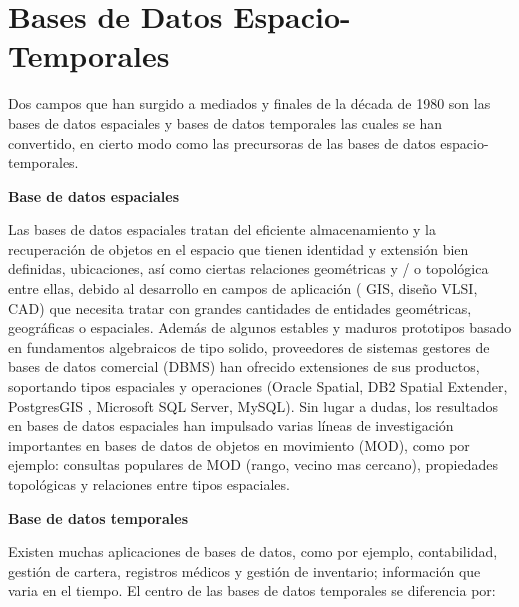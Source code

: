 

 




\section{Bases de Datos Espacio-Temporales}

Dos campos que han surgido a mediados y finales de la década de 1980 son las bases de datos espaciales y bases de
datos temporales las cuales se han convertido, en cierto modo como las precursoras de las bases de datos
espacio-temporales.


\textbf{Base de datos espaciales} 

Las bases de datos espaciales tratan del eficiente almacenamiento y la recuperación de objetos en
el espacio que tienen identidad y extensión bien definidas, ubicaciones, así como ciertas relaciones geométricas
y / o topológica entre ellas, debido al desarrollo en campos de aplicación ( GIS, diseño VLSI, CAD) que necesita
tratar con grandes cantidades de entidades geométricas, geográficas o espaciales. Además de algunos estables y 
maduros prototipos basado en fundamentos algebraicos de tipo solido,  proveedores de sistemas gestores de bases de
datos comercial (DBMS) han ofrecido extensiones de sus productos, soportando tipos espaciales y operaciones
(Oracle Spatial, DB2 Spatial Extender, PostgresGIS , Microsoft SQL Server, MySQL). Sin lugar a dudas, los 
resultados en bases de datos espaciales han impulsado varias líneas de investigación importantes en bases
de datos de objetos en movimiento (MOD), como por ejemplo: consultas populares de MOD (rango, 
vecino mas cercano), propiedades topológicas y relaciones entre tipos espaciales. \cite{yuzheng2011}


\textbf{Base de datos temporales}


Existen muchas aplicaciones de bases de datos, como por ejemplo, contabilidad, gestión de cartera, registros médicos
y gestión de inventario; información que varia en el tiempo. El centro de las bases de datos temporales se
diferencia por:

